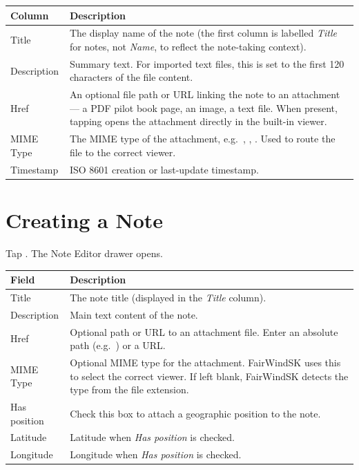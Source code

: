 \begin{longtable}{L{2.4cm} L{11.3cm}}
\toprule
{}
{\sffamily\bfseries\color{white} Column} &
{\sffamily\bfseries\color{white} Description} \\
\midrule
Title & The display name of the note (the first column is labelled \textit{Title} for notes, not \textit{Name}, to reflect the note-taking context). \\
Description & Summary text. For imported text files, this is set to the first 120 characters of the file content. \\
Href & An optional file path or URL linking the note to an attachment --- a PDF pilot book page, an image, a text file. When present, tapping  opens the attachment directly in the built-in viewer. \\
MIME Type & The MIME type of the attachment, e.g.\ , , . Used to route the file to the correct viewer. \\
Timestamp & ISO 8601 creation or last-update timestamp. \\
\bottomrule
\end{longtable}

\section{Creating a Note}

Tap . The Note Editor drawer opens.


\begin{longtable}{L{3cm} L{10.7cm}}
\toprule
{}
{\sffamily\bfseries\color{white} Field} &
{\sffamily\bfseries\color{white} Description} \\
\midrule
Title & The note title (displayed in the \textit{Title} column). \\
Description & Main text content of the note. \\
Href & Optional path or URL to an attachment file. Enter an absolute path (e.g.\ ) or a URL. \\
MIME Type & Optional MIME type for the attachment. FairWindSK uses this to select the correct viewer. If left blank, FairWindSK detects the type from the file extension. \\
Has position & Check this box to attach a geographic position to the note. \\
Latitude & Latitude when \textit{Has position} is checked. \\
Longitude & Longitude when \textit{Has position} is checked. \\
\bottomrule
\end{longtable}

